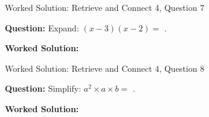 \documentclass{beamer}
\newcommand{\ablank}[1]{%
  \alt<2>{\textcolor{red}{#1}}{\underline{\phantom{#1}}}%
}
\newcommand{\ashow}[1]{\uncover<2->{\textcolor{red}{\small #1}}}
\begin{document}
\begin{frame}{Worked Solution: Retrieve and Connect 4, Question 7}

\textbf{Question:} Expand: $(x-3)(x-2)=$\ablank{$x^2-5x+6$}.

\textbf{Worked Solution:} \ashow{Use FOIL: $x^2-2x-3x+6=x^2-5x+6$.}

\end{frame}

\begin{frame}{Worked Solution: Retrieve and Connect 4, Question 8}

\textbf{Question:} Simplify: $a^2 \times a \times b=$\ablank{$a^3b$}.

\textbf{Worked Solution:} \ashow{Combine the powers of $a$: $a^2\times a=a^3$, then multiply by $b$: $a^3b$.}

\end{frame}
\end{document}
